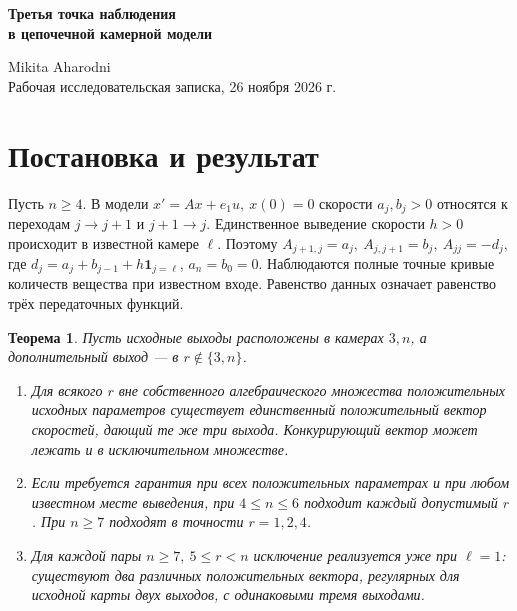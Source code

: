 \documentclass[11pt,a4paper]{article}
\newtheorem{thm}{Теорема}
\begin{document}
\begin{center}
{\LARGE\bfseries\color{ink} Третья точка наблюдения\\ в цепочечной камерной модели\par}
\vspace{7pt}Mikita Aharodni\\[2pt]
{\small Рабочая исследовательская записка, 26 ноября 2026 г.}
\end{center}
\begin{abstract}
В цепочке с входом в первую камеру наблюдения в третьей и последней камерах могут допускать два положительных регулярных набора скоростей. Доказывается, что добавление любой третьей камеры даёт глобальную единственность для типичных положительных параметров. Измерение в камере 1, 2 или 4 даёт единственность во всём положительном ортанте, когда измеряемые камеры различны. Для более удалённых выходов исключения действительно встречаются. Приводится бесконечное семейство и воспроизводимый семикамерный пример с различными скоростями выведения.
\end{abstract}

\section{Постановка и результат}
Пусть \(n\ge4\). В модели \(x'=Ax+e_1u,\ x(0)=0\) скорости \(a_j,b_j>0\) относятся к переходам \(j\to j+1\) и \(j+1\to j\). Единственное выведение скорости \(h>0\) происходит в известной камере \(\ell\). Поэтому \(A_{j+1,j}=a_j,\ A_{j,j+1}=b_j,\ A_{jj}=-d_j\), где \(d_j=a_j+b_{j-1}+h\mathbf1_{j=\ell}\), \(a_n=b_0=0\). Наблюдаются полные точные кривые количеств вещества при известном входе. Равенство данных означает равенство трёх передаточных функций.

\begin{thm}\label{t:main}
Пусть исходные выходы расположены в камерах \(3,n\), а дополнительный выход --- в \(r\notin\{3,n\}\).
\begin{enumerate}
\item Для всякого \(r\) вне собственного алгебраического множества положительных исходных параметров существует единственный положительный вектор скоростей, дающий те же три выхода. Конкурирующий вектор может лежать и в исключительном множестве.
\item Если требуется гарантия при всех положительных параметрах и при любом известном месте выведения, при \(4\le n\le6\) подходит каждый допустимый \(r\). При \(n\ge7\) подходят в точности \(r=1,2,4\).
\item Для каждой пары \(n\ge7,\ 5\le r<n\) исключение реализуется уже при \(\ell=1\): существуют два различных положительных вектора, регулярных для исходной карты двух выходов, с одинаковыми тремя выходами.
\end{enumerate}
\end{thm}
\end{document}
